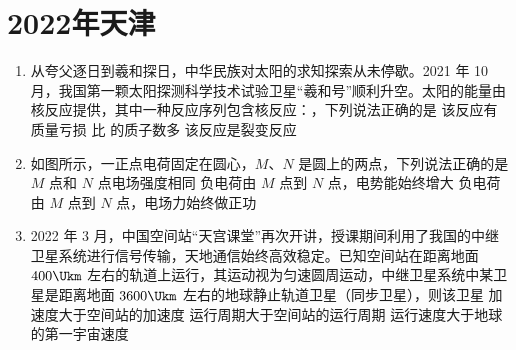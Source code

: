 \documentclass[\gkver]{gaokaozhenti}
\begin{document}
\chapter{2022年天津}

\begin{enumerate}
\item
从夸父逐日到羲和探日，中华民族对太阳的求知探索从未停歇。2021 年 10 月，我国第一颗太阳探测科学技术试验卫星“羲和号”顺利升空。太阳的能量由核反应提供，其中一种反应序列包含核反应：，下列说法正确的是
{该反应有质量亏损}
{ 比  的质子数多}
{该反应是裂变反应}

\item
如图所示，一正点电荷固定在圆心，$M$、$N$ 是圆上的两点，下列说法正确的是
{$M$ 点和 $N$ 点电场强度相同}
{负电荷由 $M$ 点到 $N$ 点，电势能始终增大}
{负电荷由 $M$ 点到 $N$ 点，电场力始终做正功}

\item
2022 年 3 月，中国空间站“天宫课堂”再次开讲，授课期间利用了我国的中继卫星系统进行信号传输，天地通信始终高效稳定。已知空间站在距离地面 $400 \Ukm$ 左右的轨道上运行，其运动视为匀速圆周运动，中继卫星系统中某卫星是距离地面 $3600 \Ukm$ 左右的地球静止轨道卫星（同步卫星），则该卫星
{加速度大于空间站的加速度}
{运行周期大于空间站的运行周期}
{运行速度大于地球的第一宇宙速度}
\end{enumerate}
\end{document}
